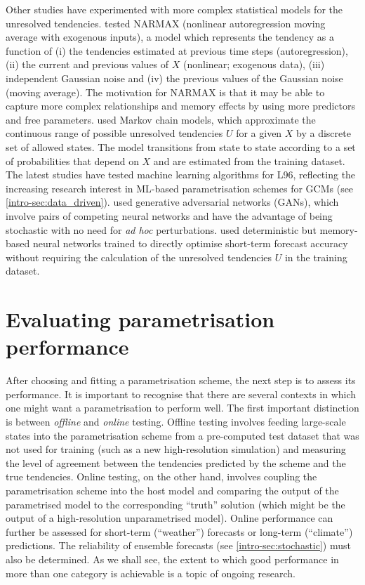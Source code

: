 \documentclass[../main.tex]{subfiles}
\begin{document}
Other studies have experimented with more complex statistical models for the
unresolved tendencies. \textcite{chorin2015} tested NARMAX (nonlinear
autoregression moving average with exogenous inputs), a model which represents
the tendency as a function of (i) the tendencies estimated at previous time
steps (autoregression), (ii) the current and previous values of $X$ (nonlinear;
exogenous data), (iii) independent Gaussian noise and (iv) the previous values
of the Gaussian noise (moving average). The motivation for NARMAX is that it
may be able to capture more complex relationships and memory effects by using
more predictors and free parameters. \textcite{crommelin2008,kwasniok2012} used
Markov chain models, which approximate the continuous range of possible
unresolved tendencies $U$ for a given $X$ by a discrete set of allowed states.
The model transitions from state to state according to a set of probabilities
that depend on $X$ and are estimated from the training dataset. The latest
studies have tested machine learning algorithms for L96, reflecting the
increasing research interest in ML-based parametrisation schemes for GCMs (see
\cref{intro-sec:data_driven}). \textcite{gagne2020} used generative adversarial
networks (GANs), which involve pairs of competing neural networks and have the
advantage of being stochastic with no need for \emph{ad hoc} perturbations.
\textcite{bhouri2023} used deterministic but memory-based neural networks
trained to directly optimise short-term forecast accuracy without requiring the
calculation of the unresolved tendencies $U$ in the training dataset.


\section{Evaluating parametrisation performance}
After choosing and fitting a parametrisation scheme, the next step is to assess
its performance. It is important to recognise that there are several contexts
in which one might want a parametrisation to perform well. The first important
distinction is between \emph{offline} and \emph{online} testing. Offline
testing involves feeding large-scale states into the parametrisation scheme
from a pre-computed test dataset that was not used for training (such as a new
high-resolution simulation) and measuring the level of agreement between the
tendencies predicted by the scheme and the true tendencies. Online testing, on
the other hand, involves coupling the parametrisation scheme into the host
model and comparing the output of the parametrised model to the corresponding
``truth'' solution (which might be the output of a high-resolution
unparametrised model). Online performance can further be assessed for
short-term (``weather'') forecasts or long-term (``climate'') predictions. The
reliability of ensemble forecasts (see \cref{intro-sec:stochastic}) must also
be determined. As we shall see, the extent to which good performance in more
than one category is achievable is a topic of ongoing research.
\end{document}

